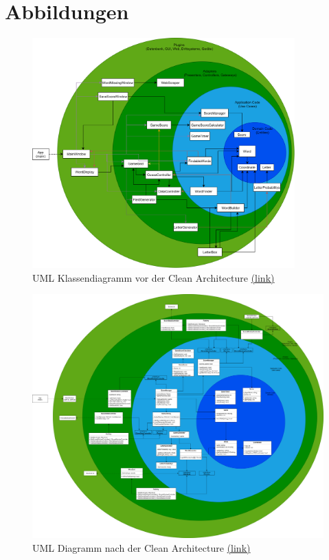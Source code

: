 \chapter{Abbildungen}

\begin{figure}[!ht]
  \centering
  \includegraphics[width=0.9\textwidth]{Bilder/CleanArchitectureBEFORE.PNG}
  \caption[UML Klassendiagramm vor der Clean Architecture]{UML Klassendiagramm vor der Clean Architecture \href{https://github.com/EinToni/WortfinderDoku/blob/main/Bilder/CleanArchitectureBEFORE.png}{(link)}}
  \label{Abb:CleanArchitectureBEFORE}
\end{figure}

\begin{figure}[!ht]
  \centering
  \includegraphics[height=0.78\textheight, angle =90]{Bilder/CleanArchitectureAFTER.PNG}
  \caption[UML Diagramm nach der Clean Architecture]{UML Diagramm nach der Clean Architecture \href{https://github.com/EinToni/WortfinderDoku/blob/main/Bilder/CleanArchitectureAFTER.png}{(link)}}
  \label{Abb:CleanArchitectureAFTER}
\end{figure}

